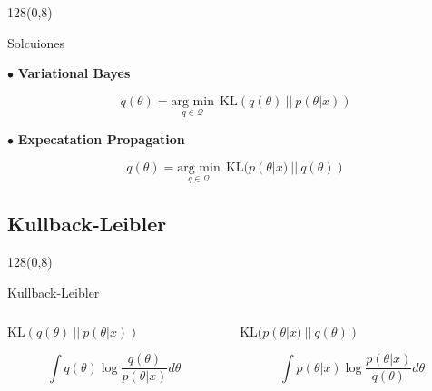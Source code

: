 \documentclass[shownotes]{beamer}
\begin{document}
\begin{frame}
\begin{textblock}{128}(0,8)
\begin{center}
 \large Solcuiones
\end{center}
\end{textblock}

$\bullet$ \textbf{Variational Bayes}

\begin{equation*}
 q(\theta) = \underset{q \in \mathcal{Q}}{\text{arg min}} \ \ \text{KL}(q(\theta) \ || \ p(\theta|x))
\end{equation*}

\pause
\vspace{0.5cm}

$\bullet$ \textbf{Expecatation Propagation}

\begin{equation*}
 q(\theta) = \underset{q \in \mathcal{Q}}{\text{arg min}} \ \ \text{KL}(p(\theta|x) \ || \  q(\theta))
\end{equation*}

\end{frame}

\subsection{Kullback-Leibler}

\begin{frame}
 \begin{textblock}{128}(0,8)
\begin{center}
 \large Kullback-Leibler
\end{center}
\end{textblock}
\vspace{0.5cm}

\begin{columns}[t]
\begin{column}{0.5\textwidth}
\centering
$\text{KL}(q(\theta) \ || \ p(\theta|x))$

\begin{equation*}
  \int q(\theta) \log \frac{q(\theta)}{p(\theta|x)} d\theta
\end{equation*}

 \end{column}
 \begin{column}{0.5\textwidth}
\centering
 $\text{KL}( p(\theta|x) \ || \ q(\theta))$

 \begin{equation*}
\int p(\theta|x) \log \frac{p(\theta|x)}{q(\theta)} d\theta
\end{equation*}

 
\end{column}
\end{columns}

 \vspace{0.5cm}

\end{frame}
\end{document}
